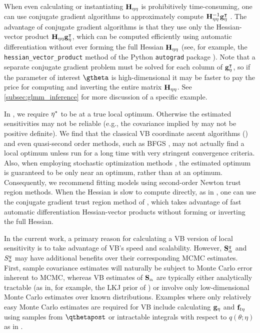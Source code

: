 \documentclass{article}\usepackage[]{graphicx}\usepackage[]{color}
\theoremstyle{plain}
\theoremstyle{definition}
\theoremstyle{plain}
\theoremstyle{plain}
\theoremstyle{plain}
\theoremstyle{plain}
\begin{document}
When even calculating or instantiating $\mathbf{H}_{\eta\eta}$ is prohibitively
time-consuming, one can use conjugate gradient algorithms to approximately
compute $\mathbf{H}_{\eta\eta}^{-1}\mathbf{g}_{\eta}^{\intercal}$ \citep[Chapter 5]{nocedalwright:1999:numerical}.
The advantage of conjugate gradient algorithms is that they use only
the Hessian-vector product $\mathbf{H}_{\eta\eta}\mathbf{g}_{\eta}^{\intercal}$, which can be
computed efficiently using automatic differentiation without ever
forming the full Hessian $\mathbf{H}_{\eta\eta}$ (see, for example, the \texttt{hessian\_vector\_product}
method of the Python \texttt{autograd} package \citep{maclaurin:2015:autograd}).
Note that a separate conjugate gradient problem must be solved for
each column of $\mathbf{g}_{\eta}^{\intercal}$, so if the parameter of interest
$\gtheta$ is high-dimensional it may be faster to pay the price for
computing and inverting the entire matrix $\mathbf{H}_{\eta\eta}$. See \ref{subsec:glmm_inference}
for more discussion of a specific example.

In , we require $\eta^{*}$ to be at a
true local optimum. Otherwise the estimated sensitivities may not
be reliable (e.g., the covariance implied by 
may not be positive definite). We find that the classical VB coordinate
ascent algorithms (\citet[Section 2.4]{blei:2016:variational}) and
even quasi-second order methods, such as BFGS \citep[e.g.][]{regier:2015:celeste},
may not actually find a local optimum unless run for a long time with
very stringent convergence criteria. Also, when employing stochastic
optimization methods \citep{hoffman:2013:stochastic,ranganath:2015:hierarchical},
the estimated optimum is guaranteed to be only near an optimum, rather
than at an optimum. Consequently, we recommend fitting models using
second-order Newton trust region methods. When the Hessian is slow
to compute directly, as in , one can use
the conjugate gradient trust region method of \citet[ Chapter 7]{nocedalwright:1999:numerical},
which takes advantage of fast automatic differentiation Hessian-vector
products without forming or inverting the full Hessian. 

In the current work, a primary reason for calculating a VB version
of local sensitivity is to take advantage of VB's speed and scalability.
However, $\mathbf{S}_{\alpha}^{q}$ and $S_{u}^{q}$ may have additional benefits
over their corresponding MCMC estimates. First, sample covariance
estimates will naturally be subject to Monte Carlo error inherent
to MCMC, whereas VB estimates of $\mathbf{S}_{\alpha}$ are typically either analytically
tractable (as in, for example, the LKJ prior of )
or involve only low-dimensional Monte Carlo estimates over known distributions.
Examples where only relatively easy Monte Carlo estimates are required
for VB include calculating $\mathbf{g}_{\eta}$ and $\mathbf{f}_{t\eta}$ using samples
from $\qthetapost$ or intractable integrals with respect to $q\left(\theta;\eta\right)$
as in .
\end{document}

